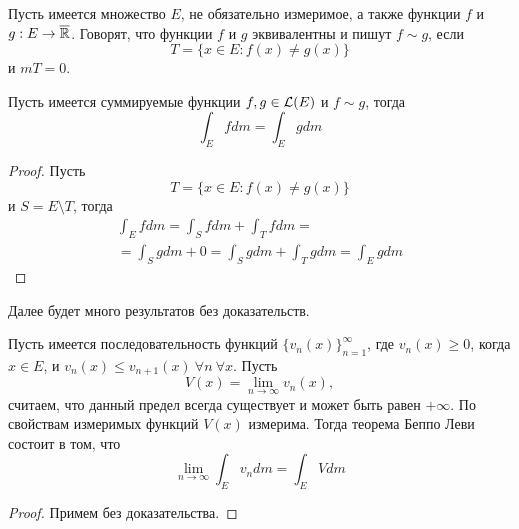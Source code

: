 \documentclass[main]{subfiles}
\begin{document}
\begin{definition}
    Пусть имеется множество $E$, не обязательно измеримое, а также функции $f$ и $g: E \to \overline{\mathbb{R}}$.
    Говорят, что функции $f$ и $g$ эквивалентны и пишут $f \sim g$, если
    \[T = \{x \in E: f(x) \neq g(x)\}\]
    и $mT = 0$.
\end{definition}

\begin{corollary}
    Пусть имеется суммируемые функции $f, g \in \mathcal{L}(E)$ и $f \sim g$, тогда
    \[\int_E fdm = \int_E gdm\]
\end{corollary}
\begin{proof}
    Пусть
    \[T = \{x \in E: f(x) \neq g(x)\}\]
    и $S = E \setminus T$, тогда
    \begin{multline*}
        \int_E fdm = \int_S fdm + \int_T fdm = \\
        = \int_S gdm + 0 = \int_S gdm + \int_T gdm = \int_E gdm
    \end{multline*}
\end{proof}

Далее будет много результатов без доказательств.
\begin{theorem}
    Пусть имеется последовательность функций $\{v_n(x)\}_{n=1}^\infty$, где $v_n(x) \ge 0$, когда $x \in E$, и $v_n(x) \le v_{n+1}(x)\ \forall n\ \forall x$.
    Пусть
    \[V(x) = \lim_{n \to \infty} v_n(x),\]
    считаем, что данный предел всегда существует и может быть равен $+\infty$.
    По свойствам измеримых функций $V(x)$ измерима.
    Тогда теорема Беппо Леви состоит в том, что
    \[\lim_{n \to \infty} \int_E v_n dm = \int_E V dm\]
\end{theorem}
\begin{proof}
    Примем без доказательства.
\end{proof}
\end{document}

